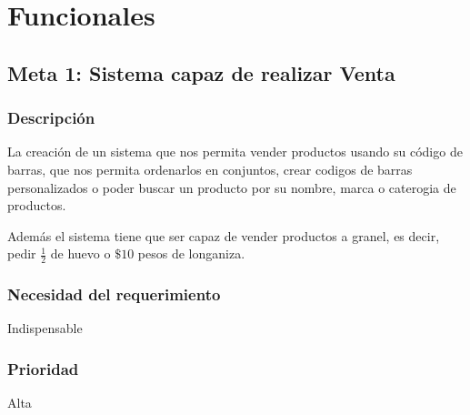 \documentclass[12pt, fleqn]{report}                             %
\theoremstyle{break}                                            %
\begin{document}
    \clearpage
    \section{Funcionales}
    \subsection{Meta 1: Sistema capaz de realizar Venta}
    
   \subsubsection{Descripción}

    La creación de un sistema que nos permita vender productos usando su código de barras, que nos permita
    ordenarlos en conjuntos, crear codigos de barras personalizados o poder buscar un producto por su nombre,
    marca o caterogia de productos.

    Además el sistema tiene que ser capaz de vender productos a granel, es decir, pedir $\frac{1}{2}$ de 
    huevo o $\$10$ pesos de longaniza.


    \subsubsection{Necesidad del requerimiento}
    Indispensable
    \subsubsection{Prioridad}
    Alta
    
\end{document}
